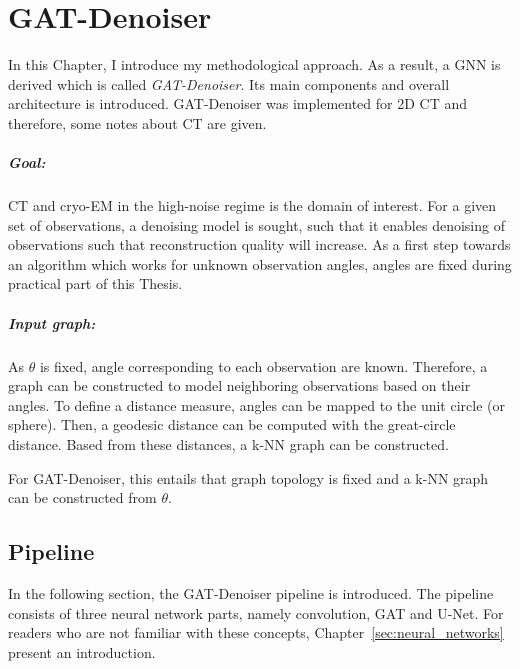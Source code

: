 \chapter{GAT-Denoiser}
\label{sec:contribution}

In this Chapter, I introduce my methodological approach.
As a result, a GNN is derived which is called \textit{GAT-Denoiser}.
Its main components and overall architecture is introduced.
GAT-Denoiser was implemented for 2D CT and therefore, some notes about CT are given.


\paragraph{Goal:}
CT and cryo-EM in the high-noise regime is the domain of interest.
For a given set of observations, a denoising model is sought, such that
it enables denoising of observations such that reconstruction quality will increase.
As a first step towards an algorithm which works for unknown observation angles, 
angles are fixed during practical part of this Thesis.


\paragraph{Input graph:}
As $\theta$ is fixed, angle corresponding to each observation are known.
Therefore, a graph can be constructed to model neighboring observations 
based on their angles.
To define a distance measure, angles can be mapped to the unit circle (or sphere).
Then, a geodesic distance can be computed with the great-circle distance.
Based from these distances, a k-NN graph can be constructed.


\begin{tcolorbox}[colback=red!5!white,colframe=red!75!black]
  For GAT-Denoiser, this entails that graph topology is fixed and
  a k-NN graph can be constructed from $\theta$.
\end{tcolorbox}

\section{Pipeline}
\label{sec:concept}

In the following section, the GAT-Denoiser pipeline is introduced. 
The pipeline consists of three neural network parts, namely convolution, GAT and U-Net.
For readers who are not familiar with these concepts, Chapter~\ref{sec:neural_networks} present an introduction.

